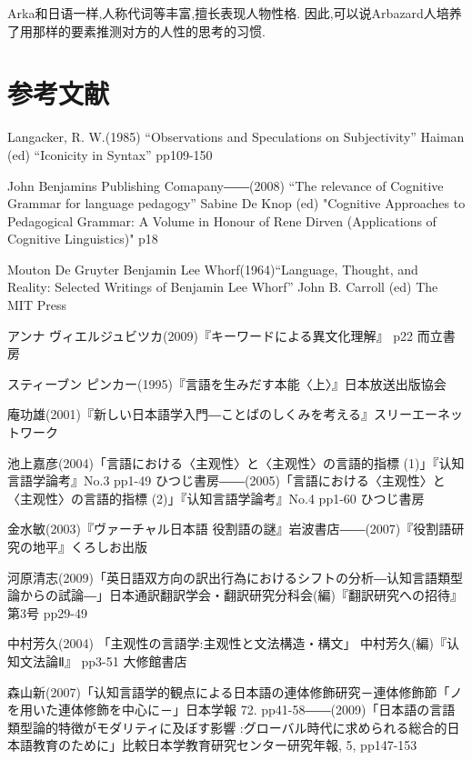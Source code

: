 Arka和日语一样,人称代词等丰富,擅长表现人物性格.
因此,可以说Arbazard人培养了用那样的要素推测对方的人性的思考的习惯.
\section{参考文献}
Langacker, R. W.(1985) ``Observations and Speculations on Subjectivity'' 
Haiman (ed) ``Iconicity in Syntax'' pp109-150

John Benjamins Publishing Comapany――(2008) ``The relevance of Cognitive Grammar for language pedagogy'' 
Sabine De Knop (ed) "Cognitive Approaches to Pedagogical Grammar: A Volume in Honour of Rene Dirven 
(Applications of Cognitive Linguistics)" p18 

Mouton De Gruyter Benjamin Lee Whorf(1964)``Language, Thought, and Reality: Selected Writings of Benjamin Lee Whorf'' 
John B. Carroll (ed) The MIT Press

アンナ ヴィエルジュビツカ(2009)『キーワードによる異文化理解』 p22 而立書房

スティーブン ピンカー(1995)『言語を生みだす本能〈上〉』日本放送出版協会

庵功雄(2001)『新しい日本語学入門―ことばのしくみを考える』スリーエーネットワーク

池上嘉彦(2004)「言語における〈主观性〉と〈主观性〉の言語的指標 (1)」『认知言語学論考』No.3 pp1-49 ひつじ書房――(2005)「言語における〈主观性〉と〈主观性〉の言語的指標 (2)」『认知言語学論考』No.4 pp1-60 ひつじ書房

金水敏(2003)『ヴァーチャル日本語 役割語の謎』岩波書店――(2007)『役割語研究の地平』くろしお出版

河原清志(2009)「英日語双方向の訳出行為におけるシフトの分析―认知言語類型論からの試論―」日本通訳翻訳学会・翻訳研究分科会(編)『翻訳研究への招待』第3号 pp29-49

中村芳久(2004) 「主观性の言語学:主观性と文法構造・構文」 中村芳久(編)『认知文法論Ⅱ』 pp3-51 大修館書店

森山新(2007)「认知言語学的観点による日本語の連体修飾研究－連体修飾節「ノを用いた連体修飾を中心に－」日本学報 72. pp41-58――(2009)「日本語の言語類型論的特徴がモダリティに及ぼす影響 :グローバル時代に求められる総合的日本語教育のために」比較日本学教育研究センター研究年報, 5, pp147-153
